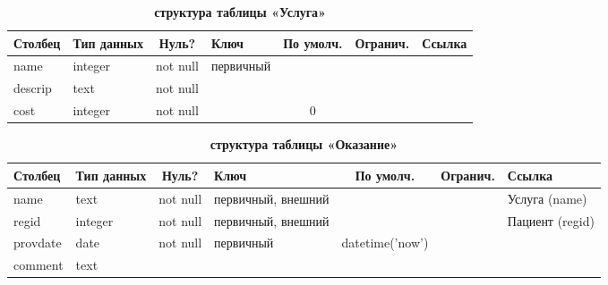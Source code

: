 \documentclass[14pt,a4paper,russian]{extreport}
\begin{document}
\begin{table}[h]
    \caption{ } 
    \begin{subtable}[t]{\textwidth}
        \caption{\textbf{структура таблицы «Услуга»}}
    \begin{tabularx}{\textwidth}{| X | X | c | X | c | c | X |}
        \hline
        \textbf{Столбец} & \textbf{Тип данных} & \textbf{Нуль?} & \textbf{Ключ} & \textbf{По
        умолч.} & \textbf{Огранич.} & \textbf{Ссылка} \\ \hline
        name & integer & not null & первичный & & & \\ \hline
        descrip & text & not null & & & & \\ \hline
        cost & integer & not null & & 0 & & \\ \hline
    \end{tabularx}
    \end{subtable}
    \label{table:serv}
\end{table}


\begin{table}[h]
    \caption{ } 
    \begin{subtable}[t]{\textwidth}
        \caption{\textbf{структура таблицы «Оказание»}}
    \begin{tabularx}{\textwidth}{| X | X | c | X | c | c | X |}
        \hline
        \textbf{Столбец} & \textbf{Тип данных} & \textbf{Нуль?} & \textbf{Ключ} & \textbf{По
        умолч.} & \textbf{Огранич.} & \textbf{Ссылка} \\ \hline
        name & text & not null & первичный, внешний & & &  Услуга (name) \\ \hline
        regid & integer & not null & первичный, внешний & & & Пациент (regid) \\ \hline
        provdate & date & not null & первичный & datetime('now') &  & \\ \hline
        comment & text & & & & & \\ \hline
    \end{tabularx}
    \end{subtable}
    \label{table:servprovision}
\end{table}
\end{document}
